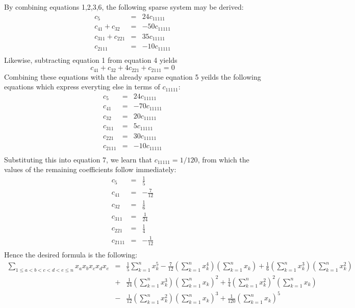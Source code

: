 \documentclass[12pt]{article}
\begin{document}
By combining equations 1,2,3,6, the following sparse system may be derived:
\begin{eqnarray*}
c_5 &=& 24 c_{11111} \\
c_{41} + c_{32} &=& - 50 c_{11111} \\
c_{311} + c_{221} &=& 35 c_{11111} \\
c_{2111} &=& -10 c_{11111} \\
\end{eqnarray*}
Likewise, subtracting equation 1 from equation 4 yields
 \[c_{41} + c_{32} + 4 c_{221} + c_{2111} = 0\]
Combining these equations with the already sparse eqnation 5 yeilds the following equations which express everyting else in terms of $c_{11111}$:
\begin{eqnarray*}
c_5 &=& 24 c_{11111} \\
c_{41} &=& - 70 c_{11111} \\
c_{32} &=& 20 c_{11111}\\
c_{311} &=& 5 c_{11111} \\
c_{221} &=& 30 c_{11111} \\
c_{2111} &=& -10 c_{11111} \\
\end{eqnarray*}
Substituting this into equation 7, we learn that $c_{11111} = 1/120$, from which  the values of the remaining coefficients follow immediately:
\begin{eqnarray*}
c_5 &=& \frac{1}{5} \\
c_{41} &=& -\frac{7}{12} \\
c_{32} &=& \frac{1}{6} \\
c_{311} &=& \frac{1}{24} \\
c_{221} &=& \frac{1}{4} \\
c_{2111} &=& -\frac{1}{12} \\
\end{eqnarray*}
Hence the desired formula is the following:
\begin{eqnarray*} \sum_{1 \le a < b < c < d < e \le n} x_a x_b x_c x_d x_e &=&
\frac{1}{5} \sum_{k=1}^n x_k^5 - \frac{7}{12} \left(\sum_{k=1}^n x_k^4\right) \left(\sum_{k=1}^n x_k \right) + \frac{1}{6} \left(\sum_{k=1}^n x_k^3 \right) \left(\sum_{k=1}^n x_k^2 \right) \\ &+&
\frac{1}{24} \left(\sum_{k=1}^n x_k^3 \right) \left(\sum_{k=1}^n x_k \right)^2 + \frac{1}{4} \left(\sum_{k=1}^n x_k^2 \right)^2 \left(\sum_{k=1}^n x_k \right) \\ &-& \frac{1}{12} \left(\sum_{k=1}^n x_k^2 \right) \left(\sum_{k=1}^n x_k \right)^3 + \frac{1}{120} \left(\sum_{k=1}^n x_k \right)^5
\end{eqnarray*}
\end{document}
